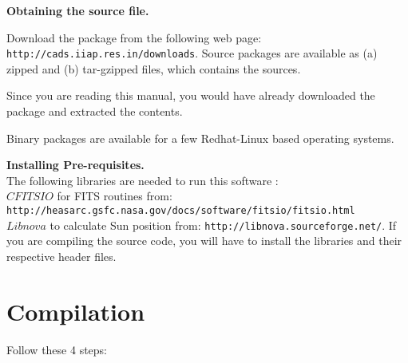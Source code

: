 \documentclass[12pt]{article}
\renewcommand{\i}{\item}
\def\i{\item}
\begin{document}
\begin{listing}
\i{\bf Obtaining the source file.}
\newenvironment{small_listing}{\begin{enumerate}\itemsep 0.001pt}{\end{enumerate}}
\begin{small_listing}
\i  Download the package from the following web page:
{\tt http://cads.iiap.res.in/downloads}.
Source packages are available as (a) zipped and (b) tar-gzipped files,
which contains the sources.\\
\i Since you are reading this manual, you would have already downloaded the
package and extracted the contents.
\i Binary packages are available for a few Redhat-Linux based operating systems.
\end{small_listing}
\i{\bf Installing Pre-requisites.}\\
The following libraries are needed to run this software :\\
$CFITSIO$ for FITS routines from: {\tt http://heasarc.gsfc.nasa.gov/docs/software/fitsio/fitsio.html}\\
$Libnova$ to calculate Sun position from: {\tt http://libnova.sourceforge.net/}. If you
are compiling the source code, you will have to install the libraries and their respective
header files.
\end{listing}

\section{Compilation}

    Follow these 4 steps:
\end{document}
